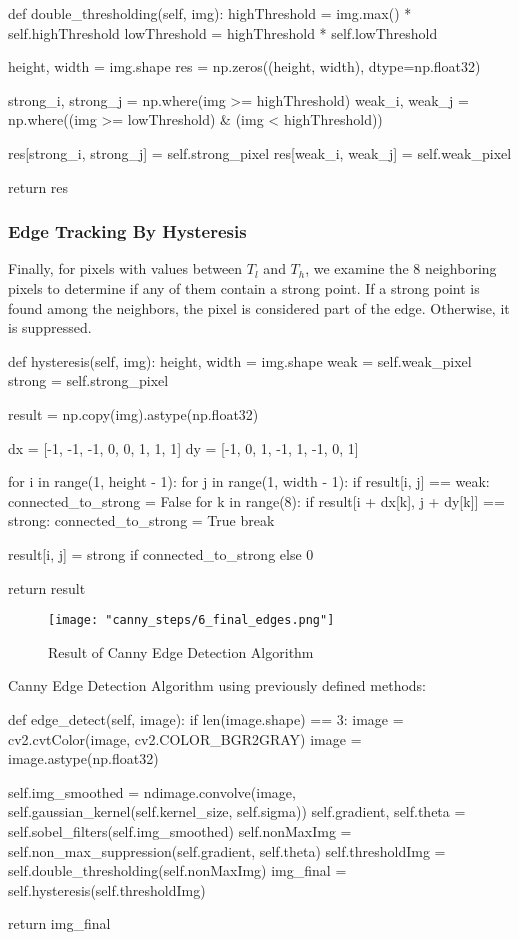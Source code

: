 \documentclass{article}
\begin{document}
	\begin{python}
def double_thresholding(self, img):
	highThreshold = img.max() * self.highThreshold
	lowThreshold = highThreshold * self.lowThreshold
	
	height, width = img.shape
	res = np.zeros((height, width), dtype=np.float32)
	
	strong_i, strong_j = np.where(img >= highThreshold)
	weak_i, weak_j = np.where((img >= lowThreshold) & (img < highThreshold))
	
	res[strong_i, strong_j] = self.strong_pixel
	res[weak_i, weak_j] = self.weak_pixel
	
	return res\end{python}

	\subsubsection{Edge Tracking By Hysteresis}
	Finally, for pixels with values between $T_l$ and $T_h$, we examine the 8 neighboring pixels to determine if any of them contain a strong point. If a strong point is found among the neighbors, the pixel is considered part of the edge. Otherwise, it is suppressed.


	\begin{python}
def hysteresis(self, img):
	height, width = img.shape
	weak = self.weak_pixel
	strong = self.strong_pixel
	
	result = np.copy(img).astype(np.float32)
	
	dx = [-1, -1, -1, 0, 0, 1, 1, 1]
	dy = [-1, 0, 1, -1, 1, -1, 0, 1]
	
	for i in range(1, height - 1):
		for j in range(1, width - 1):
			if result[i, j] == weak:
				connected_to_strong = False
				for k in range(8):
					if result[i + dx[k], j + dy[k]] == strong:
						connected_to_strong = True
						break
				
				result[i, j] = strong if connected_to_strong else 0
	
	return result\end{python} 

	\begin{figure}[H]
		\centering
		\texttt{[image: "canny\_steps/6\_final\_edges.png"]}
		\caption{Result of Canny Edge Detection Algorithm}
	\end{figure}
	
	
	Canny Edge Detection Algorithm using previously defined methods:
	\begin{python}
def edge_detect(self, image):
	if len(image.shape) == 3:
		image = cv2.cvtColor(image, cv2.COLOR_BGR2GRAY)
	image = image.astype(np.float32)
	
	self.img_smoothed = ndimage.convolve(image, self.gaussian_kernel(self.kernel_size, self.sigma))
	self.gradient, self.theta = self.sobel_filters(self.img_smoothed)
	self.nonMaxImg = self.non_max_suppression(self.gradient, self.theta)
	self.thresholdImg = self.double_thresholding(self.nonMaxImg)
	img_final = self.hysteresis(self.thresholdImg)
	
	return img_final\end{python}
\end{document}
